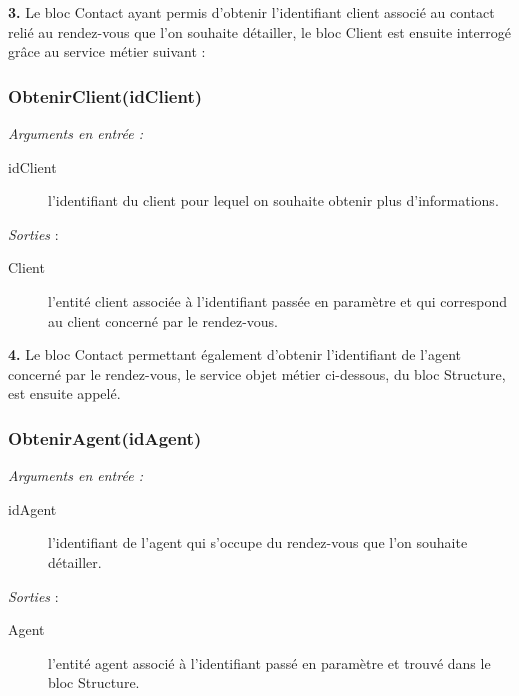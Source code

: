 \begin{shaded}
\textbf{3.} Le bloc Contact ayant permis d'obtenir l'identifiant client associé au contact relié au rendez-vous que l'on souhaite détailler, le bloc Client est ensuite interrogé grâce au service métier suivant :
\end{shaded}

\subsubsection{ObtenirClient(idClient)}

\noindent \textit{Arguments en entrée :}
\begin{description}
\item[idClient] l'identifiant du client pour lequel on souhaite obtenir plus d'informations. \\
\end{description}


\noindent \textit{Sorties} :
\begin{description}
\item[Client] l'entité client associée à l'identifiant passée en paramètre et qui correspond au client concerné par le rendez-vous.\\
\end{description}

\begin{shaded}
\textbf{4.} Le bloc Contact permettant également d'obtenir l'identifiant de l'agent concerné par le rendez-vous, le service objet métier ci-dessous, du bloc Structure, est ensuite appelé. 
\end{shaded}


\subsubsection{ObtenirAgent(idAgent)}

\noindent \textit{Arguments en entrée :}
\begin{description}
\item[idAgent] l'identifiant de l'agent qui s'occupe du rendez-vous que l'on souhaite détailler. \\
\end{description}

\noindent \textit{Sorties} :
\begin{description}
\item[Agent] l'entité agent associé à l'identifiant passé en paramètre et trouvé dans le bloc Structure. \\
\end{description} 

